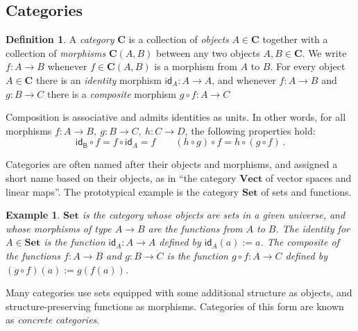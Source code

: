 \documentclass[11pt,oneside]{book}
\newtheorem{example}[theorem]{Example}
\theoremstyle{definition}
\newtheorem{definition}[theorem]{Definition}
\newcommand{\kw}[1]{\ensuremath{ \mathsf{#1} }}
\begin{document}
\subsection{Categories} %

\begin{definition} %
A \emph{category} $\mathbf{C}$
is a collection of \emph{objects} $A \in \mathbf{C}$
together with a collection of \emph{morphisms} $\mathbf{C}(A,B)$
between any two objects $A, B \in \mathbf{C}$.
We write $f : A \rightarrow B$
whenever $f \in \mathbf{C}(A,B)$ is a morphism from $A$ to $B$.
For every object $A \in \mathbf{C}$
there is an \emph{identity} morphism $\kw{id}_A : A \rightarrow A$,
and whenever $f : A \rightarrow B$ and $g : B \rightarrow C$
there is a \emph{composite} morphism $g \circ f : A \rightarrow C$

Composition is associative
and admits identities as units.
In other words,
for all morphisms
$f : A \rightarrow B, \:
 g : B \rightarrow C, \:
 h : C \rightarrow D$,
the following properties hold:
\[
  \kw{id_B} \circ f = f \circ \kw{id}_A = f
  \qquad
  (h \circ g) \circ f = h \circ (g \circ f)
  \,.
\]
\end{definition}

Categories are often named after their objects and morphisms,
and assigned a short name based on their objects,
as in ``the category $\mathbf{Vect}$ of vector spaces and linear maps''.
The prototypical example is the category $\mathbf{Set}$
of sets and functions.

\begin{example} \label{ex:set} %
$\mathbf{Set}$ is the category whose objects are sets in a given universe,
and whose morphisms of type $A \rightarrow B$
are the functions from $A$ to $B$.
The identity for $A \in \mathbf{Set}$
is the function $\kw{id}_A : A \rightarrow A$
defined by $\kw{id}_A(a) := a$.
The composite of the functions $f : A \rightarrow B$ and
$g : B \rightarrow C$
is the function $g \circ f : A \rightarrow C$
defined by $(g \circ f)(a) := g(f(a))$.
\end{example}

Many categories use
sets equipped with some additional structure as objects,
and structure-preserving functions as morphisms.
Categories of this form are known as \emph{concrete categories}.
\end{document}
